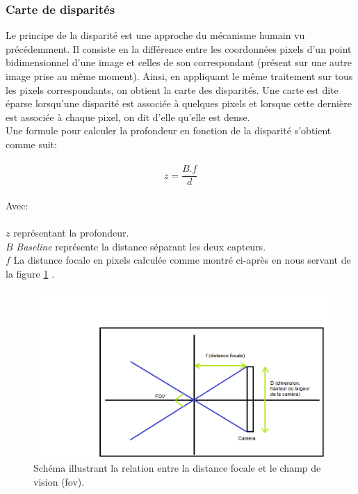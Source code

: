 \documentclass[a4paper, 12pt]{book}
\begin{document}
\subsubsection{Carte de disparités}
Le principe de la disparité est une approche du mécanisme humain vu précédemment. Il consiste en la différence entre les coordonnées pixels d'un point bidimensionnel d'une image et celles de son correspondant (présent sur une autre image prise au même moment). Ainsi, en appliquant le même traitement sur tous les pixels correspondants, on obtient la carte des disparités. Une carte est dite éparse lorsqu'une disparité est associée à quelques pixels et lorsque cette dernière est associée à chaque pixel, on dit d'elle qu'elle est dense.  \\ Une formule pour calculer la profondeur en fonction de la disparité s'obtient comme suit: \\ \\
\begin{equation}
 z = \dfrac{B.f}{d}  
\end{equation} 
\\ Avec: \\ \\
$z$ représentant la profondeur. \\
$B$ \emph{Baseline} représente la distance séparant les deux capteurs. \\
$f$ La distance focale en pixels calculée comme montré ci-après en nous servant de la figure \ref{fig-focal} . \\
\begin{figure}[htbp]
  \hspace{-3cm}
 \includegraphics[scale=0.5]{images/focalLength.png} \hspace{2cm}
  \caption{Schéma illustrant la relation entre la distance focale et le champ de vision (fov).\label{fig-focal}}
\end{figure}
\end{document}
